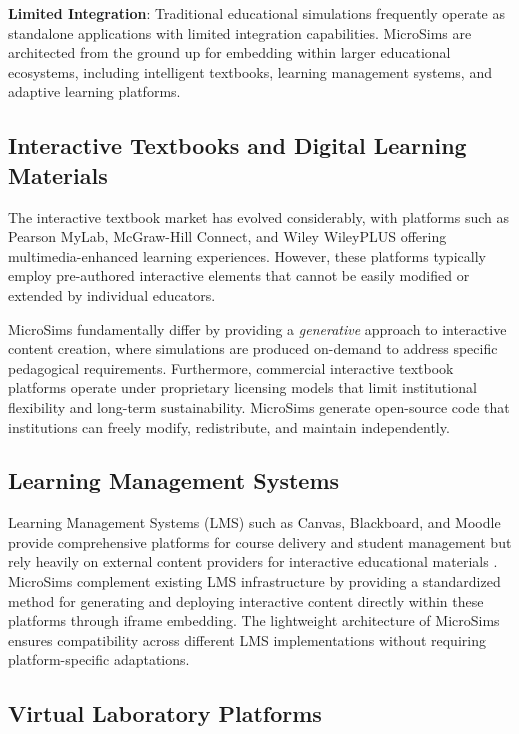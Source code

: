 \textbf{Limited Integration}: Traditional educational simulations frequently operate as standalone applications with limited integration capabilities. MicroSims are architected from the ground up for embedding within larger educational ecosystems, including intelligent textbooks, learning management systems, and adaptive learning platforms.

\subsection{Interactive Textbooks and Digital Learning Materials}

The interactive textbook market has evolved considerably, with platforms such as Pearson MyLab, McGraw-Hill Connect, and Wiley WileyPLUS offering multimedia-enhanced learning experiences. However, these platforms typically employ pre-authored interactive elements that cannot be easily modified or extended by individual educators.

MicroSims fundamentally differ by providing a \textit{generative} approach to interactive content creation, where simulations are produced on-demand to address specific pedagogical requirements. Furthermore, commercial interactive textbook platforms operate under proprietary licensing models that limit institutional flexibility and long-term sustainability. MicroSims generate open-source code that institutions can freely modify, redistribute, and maintain independently.

\subsection{Learning Management Systems}

Learning Management Systems (LMS) such as Canvas, Blackboard, and Moodle provide comprehensive platforms for course delivery and student management but rely heavily on external content providers for interactive educational materials \cite{lms2023}. MicroSims complement existing LMS infrastructure by providing a standardized method for generating and deploying interactive content directly within these platforms through iframe embedding. The lightweight architecture of MicroSims ensures compatibility across different LMS implementations without requiring platform-specific adaptations.

\subsection{Virtual Laboratory Platforms}

